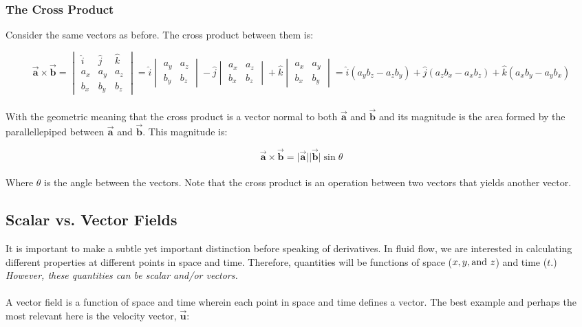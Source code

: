 \documentclass[11pt]{article}
\begin{document}
\subsubsection{The Cross Product}
Consider the same vectors as before. The cross product between them is:

\begin{equation*}
    \vec{\bm{a}} \times \vec{\bm{b}} = \begin{vmatrix}
        \hat{i} & \hat{j} & \hat{k} \\
        a_x & a_y & a_z \\
        b_x & b_y & b_z
    \end{vmatrix} = \hat{i}\begin{vmatrix}
        a_y&a_z\\b_y&b_z
    \end{vmatrix} - \hat{j}\begin{vmatrix}
        a_x&a_z\\b_x&b_z
    \end{vmatrix} + \hat{k}\begin{vmatrix}
        a_x&a_y\\b_x&b_y
    \end{vmatrix} = \hat{i}(a_yb_z - a_zb_y) + \hat{j}(a_zb_x-a_xb_z) + \hat{k}(a_xb_y - a_yb_x)
\end{equation*}\\

\noindent
With the geometric meaning that the cross product is a vector normal to both $\vec{\bm{a}}$ and $\vec{\bm{b}}$ and its magnitude is the area formed by the parallellepiped between $\vec{\bm{a}}$ and $\vec{\bm{b}}$. This magnitude is:

\begin{equation*}
    \vec{\bm{a}} \times \vec{\bm{b}} = \lvert\vec{\bm{a}}\rvert \lvert\vec{\bm{b}}\rvert\sin{\theta}
\end{equation*}\\

\noindent
Where $\theta$ is the angle between the vectors. Note that the cross product is an operation between two vectors that yields another vector.

\subsection{Scalar vs. Vector Fields}
It is important to make a subtle yet important distinction before speaking of derivatives. In fluid flow, we are interested in calculating different properties at different points in space and time. Therefore, quantities will be functions of space ($x, y, \textnormal{and}\ z$) and time ($t$.) \emph{However, these quantities can be scalar and/or vectors.}\\\\
\noindent
A vector field is a function of space and time wherein each point in space and time defines a vector. The best example and perhaps the most relevant here is the velocity vector, $\vec{\bm{u}}$:
\end{document}
